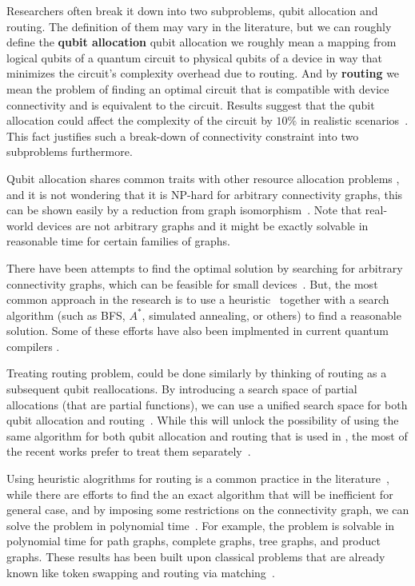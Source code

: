Researchers often break it down into two subproblems, qubit allocation and routing. The definition of them may vary in the literature, but we can roughly define the \textbf{qubit allocation} qubit allocation we roughly mean a mapping from logical qubits of a quantum circuit to physical qubits of a device in way that minimizes the circuit's complexity overhead due to routing. And by \textbf{routing} we mean the problem of finding an optimal circuit that is compatible with device connectivity and is equivalent to the circuit. Results suggest that the qubit allocation could affect the complexity of the circuit by $10\%$ in realistic scenarios~\cite{paler2019}. This fact justifies such a break-down of connectivity constraint into two subproblems furthermore.

Qubit allocation shares common traits with other resource allocation problems \cite{alicherry2012},\cite[pp. 440-444]{allen2001} and it is not wondering that it is NP-hard for arbitrary connectivity graphs, this can be shown easily by a reduction from graph isomorphism~\cite{siraichi2018}. Note that real-world devices are not arbitrary graphs and it might be exactly solvable in reasonable time for certain families of graphs. 

There have been attempts to find the optimal solution by searching for arbitrary connectivity graphs, which can be feasible for small devices~\cite{siraichi2018}. But, the most common approach in the research is to use a heuristic~\cite{zhang2021, itoko2019, cowtan2019,paler2019, murali2019} together with a search algorithm (such as BFS, $A^*$\cite{zulehner2018}, simulated annealing\cite{zhou2020}, or others\cite{li2019}) to find a reasonable solution. Some of these efforts have also been implmented in current quantum compilers \cite{qiskit2023,sivarajah2021}.

Treating routing problem, could be done similarly by thinking of routing as a subsequent qubit reallocations. By introducing a search space of partial allocations (that are partial functions), we can use a unified search space for both qubit allocation and routing~\cite{zulehner2018,childs}. While this will unlock the possibility of using the same algorithm for both qubit allocation and routing that is used in \cite{zulehner2018}, the most of the recent works prefer to treat them separately~\cite{zhou2020, li2019,lao2021,childs}.

Using heuristic alogrithms for routing is a common practice in the literature~\cite{zulehner2018, zhou2020, itoko2019, cowtan2019, li2019}, while there are efforts to find the an exact algorithm \cite{itoko2019} that will be inefficient for general case, and by imposing some restrictions on the connectivity graph, we can solve the problem in polynomial time~\cite{childs}. For example, the problem is solvable in polynomial time for path graphs, complete graphs, tree graphs, and product graphs. These results has been built upon classical problems that are already known like token swapping and routing via matching~\cite{banerjee2017}.

